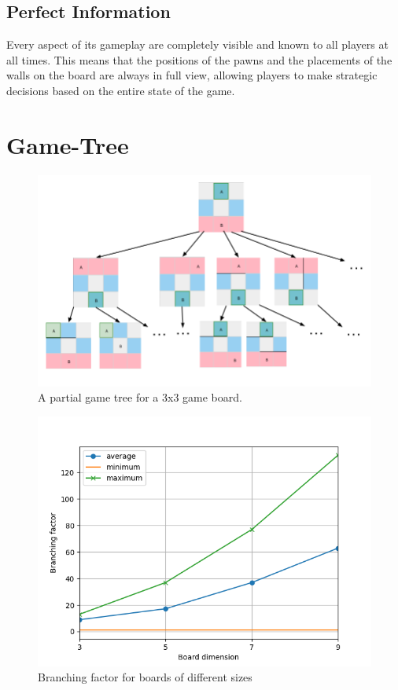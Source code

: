 \subsection{Perfect Information}
Every aspect of its gameplay are completely visible and known to all players at all times. This means
that the positions of the pawns and the placements of the walls on the board are always in full view,
allowing players to make strategic decisions based on the entire state of the game.

\newpage

\section{Game-Tree}


\begin{figure}[h]
    \centering
    \includegraphics[scale=0.45]{../img/GameBoard/game_tree.png}
    \caption{A partial game tree for a 3x3 game board.}
    \label{fig:GameTree}
\end{figure}

\begin{figure}[h]
    \centering
    \includegraphics[scale=0.6]{../img/branching_factor.png}
    \caption{Branching factor for boards of different sizes}
    \label{fig:BranchingFactor}
\end{figure}